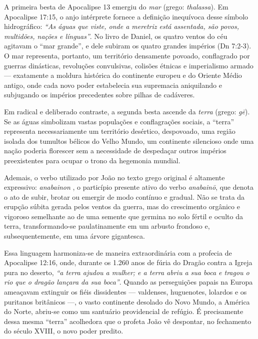 \documentclass[11pt,a4paper,openany]{book}
\begin{document}
A primeira besta de Apocalipse 13 emergiu do \textit{mar} (grego: \textit{thalassa}). Em Apocalipse 17:15, o anjo intérprete fornece a definição inequívoca desse símbolo hidrográfico: \textit{``As águas que viste, onde a meretriz está assentada, são povos, multidões, nações e línguas''}. No livro de Daniel, os quatro ventos do céu agitavam o ``mar grande'', e dele subiram os quatro grandes impérios (Dn 7:2-3). O mar representa, portanto, um território densamente povoado, conflagrado por guerras dinásticas, revoluções convulsivas, colisões étnicas e imperialismo armado — exatamente a moldura histórica do continente europeu e do Oriente Médio antigo, onde cada novo poder estabelecia sua supremacia aniquilando e subjugando os impérios precedentes sobre pilhas de cadáveres.

Em radical e deliberado contraste, a segunda besta ascende da \textit{terra} (grego: \textit{gē}). Se as águas simbolizam vastas populações e conflagrações sociais, a ``terra'' representa necessariamente um território desértico, despovoado, uma região isolada dos tumultos bélicos do Velho Mundo, um continente silencioso onde uma nação poderia florescer sem a necessidade de despedaçar outros impérios preexistentes para ocupar o trono da hegemonia mundial.

Ademais, o verbo utilizado por João no texto grego original é altamente expressivo: \textit{anabainon} , o particípio presente ativo do verbo \textit{anabainō}, que denota o ato de subir, brotar ou emergir de modo contínuo e gradual. Não se trata da erupção súbita gerada pelos ventos da guerra, mas do crescimento orgânico e vigoroso semelhante ao de uma semente que germina no solo fértil e oculto da terra, transformando-se paulatinamente em um arbusto frondoso e, subsequentemente, em uma árvore gigantesca.

Essa linguagem harmoniza-se de maneira extraordinária com a profecia de Apocalipse 12:16, onde, durante os 1.260 anos de fúria do Dragão contra a Igreja pura no deserto, \textit{``a terra ajudou a mulher; e a terra abriu a sua boca e tragou o rio que o dragão lançara da sua boca''}. Quando as perseguições papais na Europa ameaçavam extinguir os fiéis dissidentes — valdenses, huguenotes, lolardos e os puritanos britânicos —, o vasto continente desolado do Novo Mundo, a América do Norte, abriu-se como um santuário providencial de refúgio. É precisamente dessa mesma ``terra'' acolhedora que o profeta João vê despontar, no fechamento do século XVIII, o novo poder predito.
\end{document}
